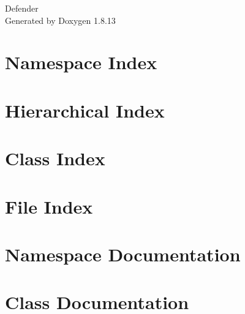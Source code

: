 \documentclass[twoside]{book}
\newcommand{\+}{\discretionary{\mbox{\scriptsize$\hookleftarrow$}}{}{}}
\newcommand{\clearemptydoublepage}{%
  \newpage{\pagestyle{empty}\cleardoublepage}%
}
\begin{document}
\hypersetup{pageanchor=false,
             bookmarksnumbered=true,
             pdfencoding=unicode
            }
\begin{titlepage}
\vspace*{7cm}
\begin{center}%
{\Large Defender }\\
\vspace*{1cm}
{\large Generated by Doxygen 1.8.13}\\
\end{center}
\end{titlepage}
\clearemptydoublepage
{}
\tableofcontents
\clearemptydoublepage
{}
\hypersetup{pageanchor=true}

\chapter{Namespace Index}

\chapter{Hierarchical Index}

\chapter{Class Index}

\chapter{File Index}

\chapter{Namespace Documentation}







\chapter{Class Documentation}



























\end{document}
